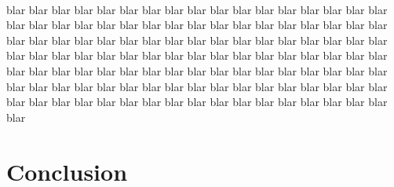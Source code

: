\documentclass{acmsiggraph}
\begin{document}

\paragraph*{}
blar blar blar blar blar blar blar blar blar blar blar blar blar blar blar
blar blar blar blar blar blar blar blar blar blar blar blar blar blar blar
blar blar blar blar blar blar blar blar blar blar blar blar blar blar blar
blar blar blar blar blar blar blar blar blar blar blar blar blar blar blar
blar blar blar blar blar blar blar blar blar blar blar blar blar blar blar
blar blar blar blar blar blar blar blar blar blar blar blar blar blar blar
blar blar blar blar blar blar blar blar blar blar blar blar blar blar blar
blar blar blar blar blar blar blar blar blar blar blar blar blar blar blar

\section{Conclusion}
\end{document}
